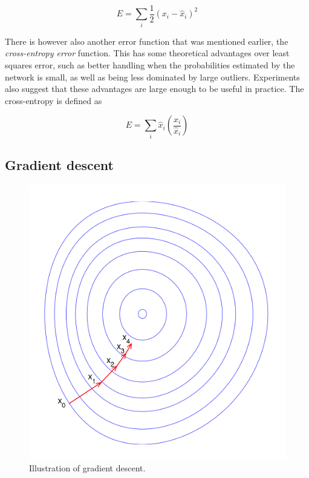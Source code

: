 \documentclass{kththesis}
\begin{document}
\[ E = \sum_i{\frac{1}{2}(x_i - \hat{x}_i)^2} \] 

There is however also another error function that was mentioned earlier, the \textit{cross-entropy error} function. This has some theoretical advantages over least squares error, such as better handling when the probabilities estimated by the network is small, as well as being less dominated by large outliers. Experiments also suggest that these advantages are large enough to be useful in practice. The cross-entropy is defined as~\cite{crossentropy_squared}

\[ E = \sum_i{\hat{x}_i\left(\frac{x_i}{\hat{x}_i}\right)} \]

\subsection{Gradient descent}
\begin{figure}
  \includegraphics[width=1.6\linewidth]{img/gradient_descent.png}
  \caption{Illustration of gradient descent.}
  \label{fig:gradient_descent}
\end{figure}
\end{document}
